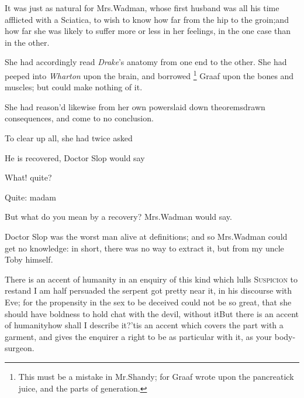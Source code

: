 \documentclass{article}
\begin{document}
It was just as natural for Mrs.\@ Wadman, whose first
husband was all his time afflicted with a Sciatica, to wish to know
how far from the hip to the groin;\break and how far she was likely to suffer more or less in
her feelings, in the one case than in the other.


She had accordingly read \textit{Drake}’s anatomy from one end to the other. She\pb
had peeped into \textit{Wharton} upon the brain, and borrowed \footnote{\enspace This must be
a mistake in Mr.\@ Shandy; for Graaf wrote upon the pancreatick
juice, and the parts of generation.} Graaf upon the bones and muscles; but
could make nothing of it.

She had reason’d likewise from her own
powers\tsh laid down theorems\break\tsh drawn
consequences, and come to no conclusion.

To clear up all, she had twice asked

\tsh He is recovered, Doctor Slop would
say\tsh

\newpage
What! quite?

\tsh Quite: madam\tsh

But what do you mean by a recovery? Mrs.\@ Wadman would
say.

Doctor Slop was the worst man alive at definitions; and
so Mrs.\@ Wadman could get no knowledge: in short, there was
no way to extract it, but from my uncle Toby himself.

There is an accent of humanity in an enquiry of this kind which
lulls \textsc{Suspicion} to rest\tsh and I am half
persuaded the serpent got pretty near it, in his discourse with
Eve; for the propensity in the sex to be deceived could not be so
great, that she should have boldness to hold chat with the devil,
without it\tsh\pb But there is an accent of
humanity\tsh\break how shall I describe it?\tsk ’tis an
accent which covers the part with a garment, and gives the enquirer
a right to be as particular with it, as your body-surgeon.
\end{document}
